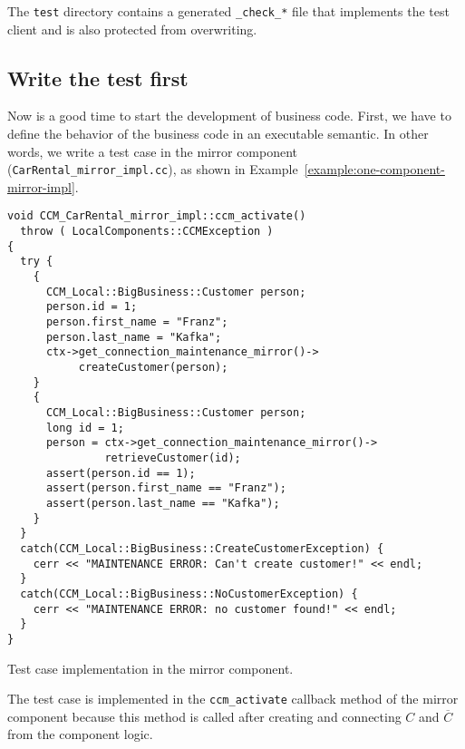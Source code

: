 The {\tt test} directory contains a generated {\tt \_check\_*} file that 
implements the test client and is also protected from overwriting.



\newpage
\subsection{Write the test first}

Now is a good time to start the development of business code. First, we have to
define the behavior of the business code in an executable semantic. 
In other words, we write a test case in the mirror component 
({\tt CarRental\_mirror\_impl.cc}), as
shown in Example~\ref{example:one-component-mirror-impl}.

\begin{Example}
\begin{minifbox}
\begin{small}
\begin{verbatim}
void CCM_CarRental_mirror_impl::ccm_activate()
  throw ( LocalComponents::CCMException )
{
  try {
    {
      CCM_Local::BigBusiness::Customer person;
      person.id = 1;
      person.first_name = "Franz";
      person.last_name = "Kafka";
      ctx->get_connection_maintenance_mirror()->
           createCustomer(person);
    }
    {
      CCM_Local::BigBusiness::Customer person;
      long id = 1;
      person = ctx->get_connection_maintenance_mirror()->
               retrieveCustomer(id);
      assert(person.id == 1);
      assert(person.first_name == "Franz");
      assert(person.last_name == "Kafka");
    }
  }
  catch(CCM_Local::BigBusiness::CreateCustomerException) {
    cerr << "MAINTENANCE ERROR: Can't create customer!" << endl;
  }
  catch(CCM_Local::BigBusiness::NoCustomerException) {
    cerr << "MAINTENANCE ERROR: no customer found!" << endl;
  }
}
\end{verbatim}
\end{small}
\end{minifbox}
\caption{Test case implementation in the mirror component.}
\label{example:one-component-mirror-impl}
\end{Example}
The test case is implemented in the {\tt ccm\_activate} callback method of the
mirror component because this method is called after creating and connecting $C$
and $\overline{C}$ from the component logic. 

